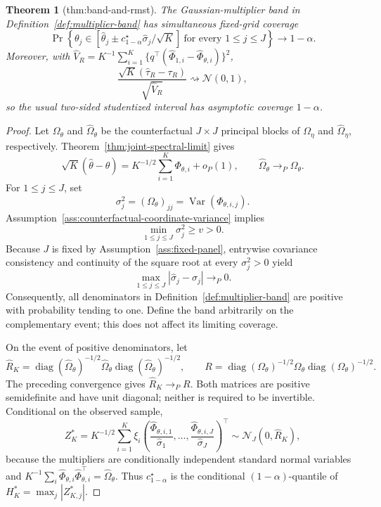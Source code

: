 \documentclass{article}
\newtheorem{theorem}{Theorem}
\begin{document}
\begin{theorem}[thm:band-and-rmst]\label{thm:band-and-rmst}
The Gaussian-multiplier band in Definition~\ref{def:multiplier-band} has simultaneous fixed-grid coverage \[\Pr\!\left\{\theta_j\in\left[\widehat\theta_j\pm c_{1-\alpha}^\star\widehat\sigma_j/\sqrt K\right]\ \text{for every }1\le j\le J\right\}\to1-\alpha.\] Moreover, with \(\widehat V_R=K^{-1}\sum_{i=1}^K\{q^\top(\widehat\Phi_{1,i}-\widehat\Phi_{\theta,i})\}^2\), \[\frac{\sqrt K(\widehat\tau_R-\tau_R)}{\sqrt{\widehat V_R}}\rightsquigarrow\mathcal N(0,1),\] so the usual two-sided studentized interval has asymptotic coverage \(1-\alpha\).
\end{theorem}
\begin{proof}
Let \(\Omega_\theta\) and \(\widehat\Omega_\theta\) be the counterfactual \(J\times J\) principal blocks of \(\Omega_\eta\) and \(\widehat\Omega_\eta\), respectively.  Theorem~\ref{thm:joint-spectral-limit} gives
\[
 \sqrt K(\widehat\theta-\theta)
 =K^{-1/2}\sum_{i=1}^K\Phi_{\theta,i}+o_P(1),
 \qquad
 \widehat\Omega_\theta\longrightarrow_P\Omega_\theta.
\]
For \(1\le j\le J\), set
\[
 \sigma_j^2=(\Omega_\theta)_{jj}
 =\operatorname{Var}(\Phi_{\theta,i,j}).
\]
Assumption~\ref{ass:counterfactual-coordinate-variance} implies
\[
 \min_{1\le j\le J}\sigma_j^2\ge v>0.
\]
Because \(J\) is fixed by Assumption~\ref{ass:fixed-panel}, entrywise covariance consistency and continuity of the square root at every \(\sigma_j^2>0\) yield
\[
 \max_{1\le j\le J}|\widehat\sigma_j-\sigma_j|\longrightarrow_P0.
\]
Consequently, all denominators in Definition~\ref{def:multiplier-band} are positive with probability tending to one.  Define the band arbitrarily on the complementary event; this does not affect its limiting coverage.

On the event of positive denominators, let
\[
 \widehat R_K
 =\operatorname{diag}(\widehat\Omega_\theta)^{-1/2}
   \widehat\Omega_\theta
   \operatorname{diag}(\widehat\Omega_\theta)^{-1/2},
 \qquad
 R
 =\operatorname{diag}(\Omega_\theta)^{-1/2}
   \Omega_\theta
   \operatorname{diag}(\Omega_\theta)^{-1/2}.
\]
The preceding convergence gives \(\widehat R_K\to_P R\).  Both matrices are positive semidefinite and have unit diagonal; neither is required to be invertible.  Conditional on the observed sample,
\[
 Z_K^*=K^{-1/2}\sum_{i=1}^K\xi_i
 \left(
   \frac{\widehat\Phi_{\theta,i,1}}{\widehat\sigma_1},
   \ldots,
   \frac{\widehat\Phi_{\theta,i,J}}{\widehat\sigma_J}
 \right)^\top
 \sim\mathcal N_J(0,\widehat R_K),
\]
because the multipliers are conditionally independent standard normal variables and
\(K^{-1}\sum_i\widehat\Phi_{\theta,i}\widehat\Phi_{\theta,i}^{\top}=\widehat\Omega_\theta\).  Thus \(c_{1-\alpha}^\star\) is the conditional \((1-\alpha)\)-quantile of \(H_K^*=\max_j|Z_{K,j}^*|\).


\end{proof}
\end{document}
